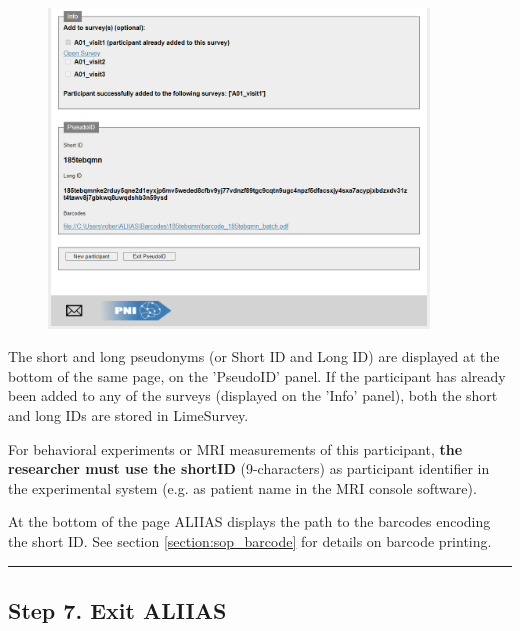 \small\setlength\fboxsep{5pt}\setlength\fboxrule{1pt}

\large

\begin{figure}[H]
\includegraphics[width=0.9\textwidth]{docs/fig/05_pseudonym.PNG}
\end{figure}

The short and long pseudonyms (or Short ID and Long ID) are displayed at the bottom of the same page, on the 'PseudoID' panel. If the participant has already been added to any of the surveys (displayed on the 'Info' panel), both the short and long IDs are stored in LimeSurvey. 

For behavioral experiments or MRI measurements of this participant, \textbf{the researcher must use the shortID} (9-characters) as participant identifier in the experimental system (e.g. as patient name in the MRI console software).

At the bottom of the page ALIIAS displays the path to the barcodes encoding the short ID. See section \ref{section:sop_barcode} for details on barcode printing.

\par\noindent\rule{\textwidth\color{pniblue}}{0.4pt}
\subsection*{Step 7. Exit ALIIAS}

